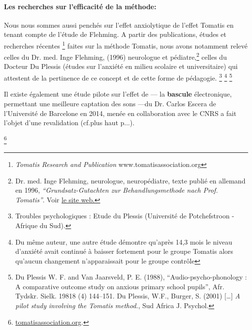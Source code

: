 \paragraph{Les recherches sur l'efficacité de la méthode:}

Nous nous sommes aussi penchés sur l'effet anxiolytique de l'effet
Tomatis en tenant compte de l'étude de Flehming.
 A partir des publications, études et recherches récentes \footnote{\emph{Tomatis Research and Publication} www.tomatisassociation.org}    faites sur la
 méthode Tomatis, nous avons notamment
 relevé celles du Dr. med. Inge Flehming, (1996) neurologue et 
pédiatre,\footnote{Dr. med. Inge Flehming,
	neurologue, neuropédiatre, texte publié en allemand
	en 1996, \emph{``Grundsatz-Gutachten zur Behandlungsmethode
		nach Prof. Tomatis''}. Voir 
\href{http://www.analytische-hoertherapie.de/uploads/tx\_templavoila/Grundsatzgu
tachten\_zur\_Behandlungsmethode\_nach\_Prof.\_Tomatis.pdf}{le site web.}}
 celles du Docteur Du Plessis (études sur l'anxiété en
 milieu scolaire et universitaire) qui  attestent de la pertinence de ce
 concept et de cette forme de pédagogie. \footnote{Troubles 
psychologiques : Etude du Plessis (Université de Potchefstroon
- Afrique du Sud).}  \footnote{Du même auteur, une autre étude démontre qu'après 14,3
mois le niveau d'an\-xié\-té avait continué à baisser fortement
pour le groupe Tomatis alors qu'aucun
changement n'apparaissait pour le groupe contrôle}%
\footnote{Du Plessis W. F. and Van Jaarsveld, P. E. (1988),
	``Audio-psycho-phonology : A comparative outcome study on anxious 
primary school pupils'',  Afr. Tydskr. Sielk. 19818 (4) 144--151. Du Plessis, W.F., Burger, S. (2001) [\ldots]
	\emph{A pilot study involving the Tomatis method.}, Sud Africa J. 
Psychol.}
 
Il existe également une étude pilote sur l'effet de 
--- la \textbf{bascule} \label{bascule} électronique, permettant une meilleure
captation des sons ---du Dr. Carlos Escera
de l'Université de Barcelone en 2014, menée en collaboration avec le CNRS  a fait 
l'objet d'une revalidation (cf.plus haut p...).



\footnote{
\href{http://tomatisassociation.org/scientific-validation-of-the-tomatis-effect-
eeg-recordings-of-sound-from-brainstem-to-cerebral-cortex-encoding-university-of
-barcelona-2014/}{tomatisassociation.org}.}  \label{bascule}









